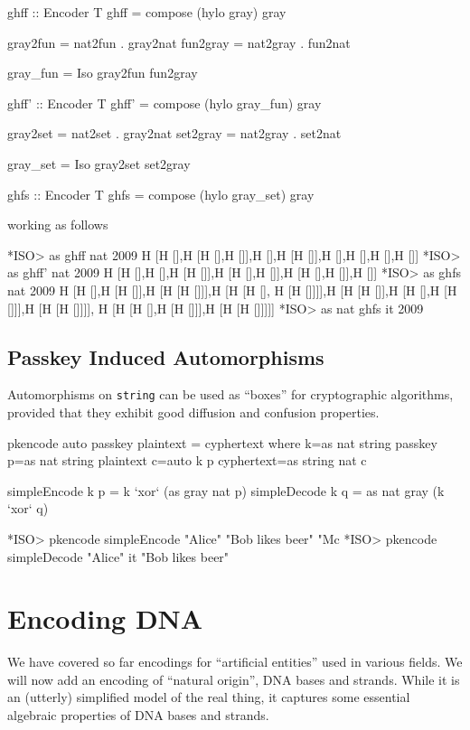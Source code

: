 \documentclass[]{INCLUDES/llncs}
\begin{document}
\begin{code}
ghff :: Encoder T
ghff = compose (hylo gray) gray

gray2fun = nat2fun . gray2nat
fun2gray = nat2gray . fun2nat 

gray_fun = Iso gray2fun fun2gray

ghff' :: Encoder T
ghff' = compose (hylo gray_fun) gray

gray2set = nat2set . gray2nat
set2gray = nat2gray . set2nat 

gray_set = Iso gray2set set2gray

ghfs :: Encoder T
ghfs = compose (hylo gray_set) gray
\end{code}
working as follows
\begin{codex}
*ISO> as ghff nat 2009
H [H [],H [H [],H []],H [],H [H []],H [],H [],H [],H []]
*ISO> as ghff' nat 2009
H [H [],H [],H [H []],H [H [],H []],H [H [],H []],H []]
*ISO> as ghfs nat 2009
H [H [],H [H []],H [H [H []]],H [H [H [],
   H [H []]]],H [H [H []],H [H [],H [H []]],H [H [H []]]],
   H [H [H [],H [H []]],H [H [H []]]]]
*ISO> as nat ghfs it
2009
\end{codex}

\subsection{Passkey Induced Automorphisms}

Automorphisms on {\tt string} can be used as ``boxes'' for 
cryptographic algorithms, provided that they exhibit good diffusion and
confusion properties.

\begin{code}
pkencode auto passkey plaintext = cyphertext where
  k=as nat string passkey
  p=as nat string plaintext
  c=auto k p
  cyphertext=as string nat c

simpleEncode k p = k `xor` (as gray nat p)
simpleDecode k q = as nat gray (k `xor` q)
\end{code}

\begin{codex}
*ISO> pkencode simpleEncode "Alice" "Bob likes beer"
"Mc%
*ISO> pkencode simpleDecode "Alice" it
"Bob likes beer"
\end{codex}

\section{Encoding DNA}
We have covered so far encodings for ``artificial entities'' used in various
fields. We will now add an encoding of ``natural origin'', DNA bases and
strands. While it is an (utterly) simplified model of the real thing, it captures
some essential algebraic properties of DNA bases and strands.
\end{document}
